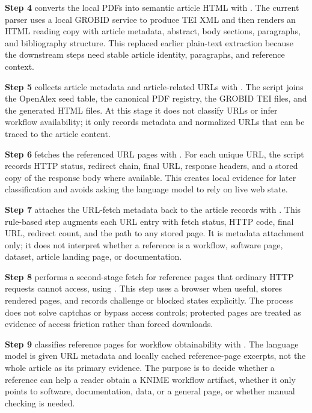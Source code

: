 \documentclass[runningheads]{llncs}
\begin{document}
\textbf{Step 4} converts the local PDFs into semantic article HTML with
. The current parser uses a local
GROBID service to produce TEI XML and then renders an HTML reading copy with
article metadata, abstract, body sections, paragraphs, and bibliography
structure. This replaced earlier plain-text extraction because the downstream
steps need stable article identity, paragraphs, and reference context.

\textbf{Step 5} collects article metadata and article-related URLs with
. The script joins the OpenAlex seed
table, the canonical PDF registry, the GROBID TEI files, and the generated HTML
files. At this stage it does not classify URLs or infer workflow availability;
it only records metadata and normalized URLs that can be traced to the article
content.

\textbf{Step 6} fetches the referenced URL pages with
. For each unique URL, the script
records HTTP status, redirect chain, final URL, response headers, and a stored
copy of the response body where available. This creates local evidence for
later classification and avoids asking the language model to rely on live web
state.

\textbf{Step 7} attaches the URL-fetch metadata back to the article records with
. This rule-based step augments
each URL entry with fetch status, HTTP code, final URL, redirect count, and the
path to any stored page. It is metadata attachment only; it does not interpret
whether a reference is a workflow, software page, dataset, article landing
page, or documentation.

\textbf{Step 8} performs a second-stage fetch for reference pages that ordinary HTTP
requests cannot access, using . This
step uses a browser when useful, stores rendered pages, and records challenge
or blocked states explicitly. The process
does not solve captchas or bypass access controls; protected pages are treated
as evidence of access friction rather than forced downloads.

\textbf{Step 9} classifies reference pages for workflow obtainability with
. The language model is
given URL metadata and locally cached reference-page excerpts, not the whole
article as its primary evidence. The purpose is to decide whether a reference
can help a reader obtain a KNIME workflow artifact, whether it only points to
software, documentation, data, or a general page, or whether manual checking is
needed.
\end{document}
